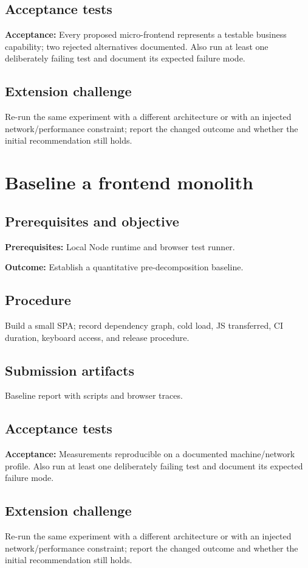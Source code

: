 \documentclass[11pt,letterpaper,oneside]{report}
\newcommand{\criterion}[1]{\textbf{Acceptance:} #1}
\begin{document}
\section{Acceptance tests}
\criterion{Every proposed micro-frontend represents a testable business capability; two rejected alternatives documented.} Also run at least one deliberately failing test and document its expected failure mode.
\section{Extension challenge}
Re-run the same experiment with a different architecture or with an injected network/performance constraint; report the changed outcome and whether the initial recommendation still holds.

\chapter{Baseline a frontend monolith}
\section{Prerequisites and objective}
\textbf{Prerequisites:} Local Node runtime and browser test runner.\par
\textbf{Outcome:} Establish a quantitative pre-decomposition baseline.
\section{Procedure}
Build a small SPA; record dependency graph, cold load, JS transferred, CI duration, keyboard access, and release procedure.
\section{Submission artifacts}
Baseline report with scripts and browser traces.
\section{Acceptance tests}
\criterion{Measurements reproducible on a documented machine/network profile.} Also run at least one deliberately failing test and document its expected failure mode.
\section{Extension challenge}
Re-run the same experiment with a different architecture or with an injected network/performance constraint; report the changed outcome and whether the initial recommendation still holds.
\end{document}
